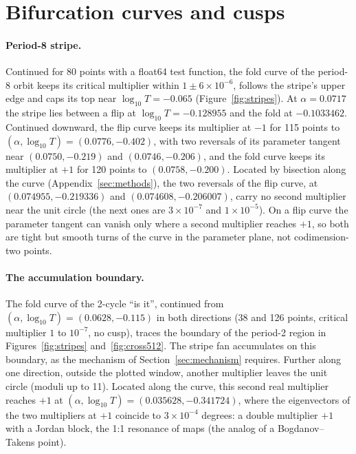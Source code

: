 \documentclass[11pt,letterpaper]{article}
\begin{document}
\section{Bifurcation curves and cusps}
\label{sec:curves}
\paragraph{Period-8 stripe.} Continued for 80 points with a float64 test function, the fold curve of the period-8
orbit keeps its critical multiplier within $1\pm6\times10^{-6}$, follows the stripe's upper edge and caps its top near
$\log_{10}T=-0.065$ (Figure~\ref{fig:stripes}). At $\alpha=0.0717$ the stripe lies between a flip at
$\log_{10}T=-0.128955$ and the fold at $-0.1033462$. Continued downward, the flip curve keeps its multiplier at $-1$
for 115 points to $(\alpha,\log_{10}T)=(0.0776,-0.402)$, with two reversals of its parameter tangent near
$(0.0750,-0.219)$ and $(0.0746,-0.206)$, and the fold curve keeps its multiplier at $+1$ for 120 points to
$(0.0758,-0.200)$. Located by bisection along the curve (Appendix~\ref{sec:methods}), the two reversals of the flip
curve, at $(0.074955,-0.219336)$ and $(0.074608,-0.206007)$, carry no second multiplier near the unit circle (the
next ones are $3\times10^{-7}$ and $1\times10^{-5}$). On a flip curve the parameter tangent can vanish only where a
second multiplier reaches $+1$, so both are tight but smooth turns of the curve in the parameter plane, not
codimension-two points.

\paragraph{The accumulation boundary.} The fold curve of the 2-cycle ``is it'', continued from
$(\alpha,\log_{10}T)=(0.0628,-0.115)$ in both directions (38 and 126 points, critical multiplier $1$ to $10^{-7}$, no
cusp), traces the boundary of the period-2 region in Figures~\ref{fig:stripes} and~\ref{fig:cross512}. The stripe fan
accumulates on this boundary, as the mechanism of Section~\ref{sec:mechanism} requires. Further along one direction,
outside the plotted window, another multiplier leaves the unit circle (moduli up to 11). Located along the curve,
this second real multiplier reaches $+1$ at $(\alpha,\log_{10}T)=(0.035628,-0.341724)$, where the eigenvectors of
the two multipliers at $+1$ coincide to $3\times10^{-4}$ degrees: a double multiplier $+1$ with a Jordan block,
the 1:1 resonance of maps (the analog of a Bogdanov--Takens point).
\end{document}
